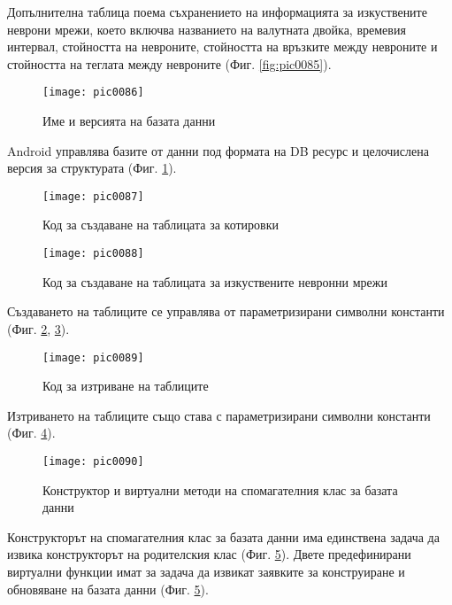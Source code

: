 Допълнителна таблица поема съхранението на информацията за изкуствените неврони мрежи, което включва названието на валутната двойка, времевия интервал, стойността на невроните, стойността на връзките между невроните и стойността на теглата между невроните (Фиг. \ref{fig:pic0085}). 

\begin{figure}[h]
  \centering
  \texttt{[image: pic0086]}
  \caption{Име и версията на базата данни}
\label{fig:pic0086}
\end{figure}
\FloatBarrier

Android управлява базите от данни под формата на DB ресурс и целочислена версия за структурата (Фиг. \ref{fig:pic0086}).

\begin{figure}[h]
  \centering
  \texttt{[image: pic0087]}
  \caption{Код за създаване на таблицата за котировки}
\label{fig:pic0087}
\end{figure}
\FloatBarrier

\begin{figure}[h]
  \centering
  \texttt{[image: pic0088]}
  \caption{Код за създаване на таблицата за изкуствените невронни мрежи}
\label{fig:pic0088}
\end{figure}
\FloatBarrier

Създаването на таблиците се управлява от параметризирани символни константи (Фиг. \ref{fig:pic0087}, \ref{fig:pic0088}).

\begin{figure}[h]
  \centering
  \texttt{[image: pic0089]}
  \caption{Код за изтриване на таблиците}
\label{fig:pic0089}
\end{figure}
\FloatBarrier

Изтриването на таблиците също става с параметризирани символни константи (Фиг. \ref{fig:pic0089}).

\begin{figure}[h]
  \centering
  \texttt{[image: pic0090]}
  \caption{Конструктор и виртуални методи на спомагателния клас за базата данни}
\label{fig:pic0090}
\end{figure}
\FloatBarrier

Конструкторът на спомагателния клас за базата данни има единствена задача да извика конструкторът на родителския клас (Фиг. \ref{fig:pic0090}). Двете предефинирани виртуални функции имат за задача да извикат заявките за конструиране и обновяване на базата данни (Фиг. \ref{fig:pic0090}). 

